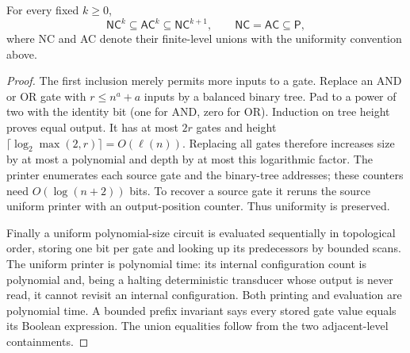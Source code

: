 \begin{theorem}\label{thm:A05}
For every fixed $k\ge0$,
\[
 \mathsf{NC}^k\subseteq\mathsf{AC}^k\subseteq\mathsf{NC}^{k+1},
 \qquad \mathsf{NC}=\mathsf{AC}\subseteq\mathsf P,
\]
where NC and AC denote their finite-level unions with the uniformity convention above.
\end{theorem}
\begin{proof}
The first inclusion merely permits more inputs to a gate. Replace an AND or OR gate with $r\le n^a+a$ inputs by a balanced binary tree. Pad to a power of two with the identity bit (one for AND, zero for OR). Induction on tree height proves equal output. It has at most $2r$ gates and height $\lceil\log_2\max(2,r)\rceil=O(\ell(n))$. Replacing all gates therefore increases size by at most a polynomial and depth by at most this logarithmic factor. The printer enumerates each source gate and the binary-tree addresses; these counters need $O(\log(n+2))$ bits. To recover a source gate it reruns the source uniform printer with an output-position counter. Thus uniformity is preserved.

Finally a uniform polynomial-size circuit is evaluated sequentially in topological order, storing one bit per gate and looking up its predecessors by bounded scans. The uniform printer is polynomial time: its internal configuration count is polynomial and, being a halting deterministic transducer whose output is never read, it cannot revisit an internal configuration. Both printing and evaluation are polynomial time. A bounded prefix invariant says every stored gate value equals its Boolean expression. The union equalities follow from the two adjacent-level containments.
\end{proof}

